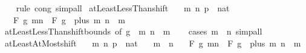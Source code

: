 \begin{isabellebody}
%
\isadelimproof
\ \ %
\endisadelimproof
%
\isatagproof
{}\isamarkupfalse%
\ {\isacharparenleft}{\kern0pt}rule\ cong{\isacharparenright}{\kern0pt}\ simp{\isacharunderscore}{\kern0pt}all%
\endisatagproof
{\isafoldproof}%
%
\isadelimproof
\isanewline
%
\endisadelimproof
\isanewline
{}\isamarkupfalse%
\ atLeastLessThan{\isacharunderscore}{\kern0pt}shift{\isacharunderscore}{\kern0pt}{}{\isacharcolon}{\kern0pt}\isanewline
\ \ \ m\ n\ p\ {\isacharcolon}{\kern0pt}{\isacharcolon}{\kern0pt}\ nat\isanewline
\ \ \ {\isachardoublequoteopen}F\ g\ {\isacharbraceleft}{\kern0pt}m{\isachardot}{\kern0pt}{\isachardot}{\kern0pt}{\isacharless}{\kern0pt}n{\isacharbraceright}{\kern0pt}\ {\isacharequal}{\kern0pt}\ F\ {\isacharparenleft}{\kern0pt}g\ {\isasymcirc}\ plus\ m{\isacharparenright}{\kern0pt}\ {\isacharbraceleft}{\kern0pt}{}{\isachardot}{\kern0pt}{\isachardot}{\kern0pt}{\isacharless}{\kern0pt}n\ {\isacharminus}{\kern0pt}\ m{\isacharbraceright}{\kern0pt}{\isachardoublequoteclose}\isanewline
%
\isadelimproof
\ \ %
\endisadelimproof
%
\isatagproof
{}\isamarkupfalse%
\ atLeastLessThan{\isacharunderscore}{\kern0pt}shift{\isacharunderscore}{\kern0pt}bounds\ {\isacharbrackleft}{\kern0pt}of\ g\ {}\ m\ {\isachardoublequoteopen}n\ {\isacharminus}{\kern0pt}\ m{\isachardoublequoteclose}{\isacharbrackright}{\kern0pt}\isanewline
\ \ \isamarkupfalse%
\ {\isacharparenleft}{\kern0pt}cases\ {\isachardoublequoteopen}m\ {\isasymle}\ n{\isachardoublequoteclose}{\isacharparenright}{\kern0pt}\ simp{\isacharunderscore}{\kern0pt}all%
\endisatagproof
{\isafoldproof}%
%
\isadelimproof
\isanewline
%
\endisadelimproof
\isanewline
{}\isamarkupfalse%
\ atLeastAtMost{\isacharunderscore}{\kern0pt}shift{\isacharunderscore}{\kern0pt}{}{\isacharcolon}{\kern0pt}\isanewline
\ \ \ m\ n\ p\ {\isacharcolon}{\kern0pt}{\isacharcolon}{\kern0pt}\ nat\isanewline
\ \ \ {\isachardoublequoteopen}m\ {\isasymle}\ n{\isachardoublequoteclose}\isanewline
\ \ \ {\isachardoublequoteopen}F\ g\ {\isacharbraceleft}{\kern0pt}m{\isachardot}{\kern0pt}{\isachardot}{\kern0pt}n{\isacharbraceright}{\kern0pt}\ {\isacharequal}{\kern0pt}\ F\ {\isacharparenleft}{\kern0pt}g\ {\isasymcirc}\ plus\ m{\isacharparenright}{\kern0pt}\ {\isacharbraceleft}{\kern0pt}{}{\isachardot}{\kern0pt}{\isachardot}{\kern0pt}n\ {\isacharminus}{\kern0pt}\ m{\isacharbraceright}{\kern0pt}{\isachardoublequoteclose}\isanewline
%
\isadelimproof

\end{isabellebody}
